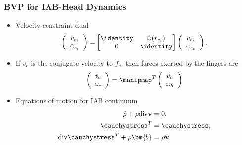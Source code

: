 \begin{frame}
	\frametitle{BVP for IAB-Head Dynamics}
	\begin{itemize}
		\item 
		Velocity constraint dual
		\begin{align}
		\left(
		\begin{array}{c}
		\tilde{v}_{c_i} \\ \tilde{\omega}_{c_i}
		\end{array}
		\right) 
		= \begin{bmatrix}
		\identity & \hat{\omega}(r_{c_i}) \\
		0 & \identity
		\end{bmatrix}
		\left(
		\begin{array}{c}
		{v}_{c_h} \\ {\omega}_{c_h}
		\end{array}
		\right).
		\end{align}
		\item If $v_c$ is the conjugate velocity to $f_c$, then forces exerted by the fingers are
		\begin{align}
			\left(
			\begin{array}{c}
				v_c \\ \omega_c
			\end{array}\right) = \manipmap^T \left(\begin{array}{c} v_h \\ \omega_h \end{array}\right)
		\end{align}
		\item Equations of motion for IAB continuum
		\begin{subequations}
			\begin{align}
			\dot{\rho} + \rho \text{div} \textbf{v} &= 0 \label{eq:continuum-1}, \\
			\cauchystress^T &= \cauchystress,  \label{eq:continuum-2}\\
			\text{div} \cauchystress^T + \rho \bm{b} &= \rho \dot{\textbf{v}} \label{eq:continuum-3}
			\end{align} 
		\end{subequations}
	\end{itemize}
\end{frame}

